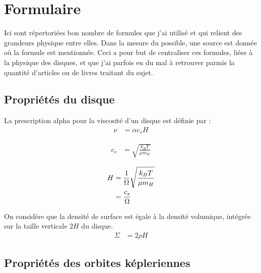 \chapter{Formulaire}
Ici sont répertoriées bon nombre de formules que j'ai utilisé et qui relient des grandeurs physique entre elles. Dans la mesure du possible, une source est donnée où la formule est mentionnée. Ceci a pour but de centraliser ces formules, liées à la physique des disques, et que j'ai parfois eu du mal à retrouver parmis la quantité d'articles ou de livres traitant du sujet. 

\section{Propriétés du disque}

La prescription alpha pour la viscosité d'un disque est définie par :
\begin{align}
\nu &= \alpha c_s H
\end{align}

\begin{align}
c_s &= \sqrt{\frac{k_B T}{\mu m_H}}
\end{align}

\begin{align}
H &= \frac{1}{\Omega}\sqrt{\frac{k_B T}{\mu m_H}}\\
&= \frac{c_s}{\Omega}
\end{align}

On considère que la densité de surface est égale à la densité volumique, intégrée sur la taille verticale $2H$ du disque. 
\begin{align}
\Sigma &= 2\rho H
\end{align}

\section{Propriétés des orbites képleriennes}
